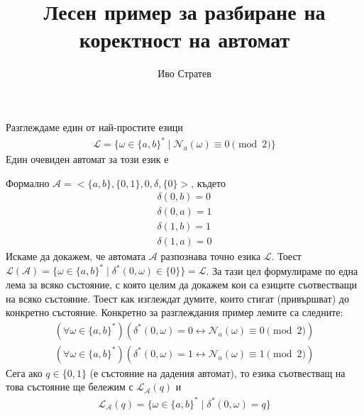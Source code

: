 \documentclass[12pt]{article}
\title{Лесен пример за разбиране на коректност на автомат}
\author{Иво Стратев}
\begin{document}
\maketitle

Разглеждаме един от най-простите езици
\begin{align*}
    \mathcal{L} = \{\omega \in \{a, b\}^* \; | \; \mathcal{N}_a(\omega) \equiv 0 \pmod{2}\}
\end{align*}
Един очевиден автомат за този език е
\begin{center}
\end{center}
Формално \(\mathcal{A} = <\{a, b\}, \{0, 1\}, 0, \delta, \{0\}>\),
където
\begin{align*}
    \delta(0, b) = 0 \\
    \delta(0, a) = 1 \\
    \delta(1, b) = 1 \\
    \delta(1, a) = 0
\end{align*}
Искаме да докажем, че автомата \(\mathcal{A}\) разпознава точно езика \(\mathcal{L}\).
Тоест \(\mathcal{L}(\mathcal{A}) = \{\omega \in \{a, b\}^* \; | \; \delta^*(0, \omega) \in \{0\}\} = \mathcal{L}\).
За тази цел формулираме по една лема за всяко състояние, с която целим да докажем
кои са езиците съотвестващи на всяко състояние. Тоест как изглеждат думите,
които стигат (привършват) до конкретно състояние.
Конкретно за разглеждания пример лемите са следните:
\begin{align*}
    (\forall \omega \in \{a, b\}^*)(\delta^*(0, \omega) = 0 \longleftrightarrow \mathcal{N}_a(\omega) \equiv 0 \pmod{2}) \\
    (\forall \omega \in \{a, b\}^*)(\delta^*(0, \omega) = 1 \longleftrightarrow \mathcal{N}_a(\omega) \equiv 1 \pmod{2})
\end{align*}
Сега ако \(q \in \{0, 1\}\) (е състояние на дадения автомат), то езика съотвестващ на това състояние ще бележим с \(\mathcal{L}_\mathcal{A}(q)\) и
\begin{align*}
\mathcal{L}_\mathcal{A}(q) = \{\omega \in \{a, b\}^* \; | \; \delta^*(0, \omega) = q\}
\end{align*}
\end{document}
